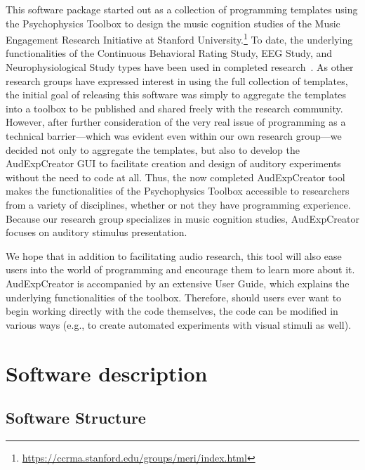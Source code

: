 \documentclass[preprint,12pt, a4paper]{elsarticle}
\begin{document}
This software package started out as a collection of programming templates using the Psychophysics Toolbox to design the music cognition studies of the Music Engagement Research Initiative at Stanford University.\footnote{\url{https://ccrma.stanford.edu/groups/meri/index.html}} To date, the underlying functionalities of the Continuous Behavioral Rating Study, EEG Study, and Neurophysiological Study types have been used in completed research~\cite{kaneshiro2016dissertation,kaneshiro2016neurophysiologicalAndBehavioral,losorelli2017NMEDTPaper}. As other research groups have expressed interest in using the full collection of templates, the initial goal of releasing this software was simply to aggregate the templates into a toolbox to be published and shared freely with the research community. However, after further consideration of the very real issue of programming as a technical barrier---which was evident even within our own research group---we decided not only to aggregate the templates, but also to develop the AudExpCreator GUI to facilitate creation and design of auditory experiments without the need to code at all. Thus, the now completed AudExpCreator tool makes the functionalities of the Psychophysics Toolbox accessible to researchers from a variety of disciplines, whether or not they have programming experience. Because our research group specializes in music cognition studies, AudExpCreator focuses on auditory stimulus presentation.

We hope that in addition to facilitating audio research, this tool will also ease users into the world of programming and encourage them to learn more about it. AudExpCreator is accompanied by an extensive User Guide, which explains the underlying functionalities of the toolbox. Therefore, should users ever want to begin working directly with the code themselves, the code can be modified in various ways (e.g., to create automated experiments with visual stimuli as well). 


\section{Software description}

\subsection{Software Structure}
\end{document}
